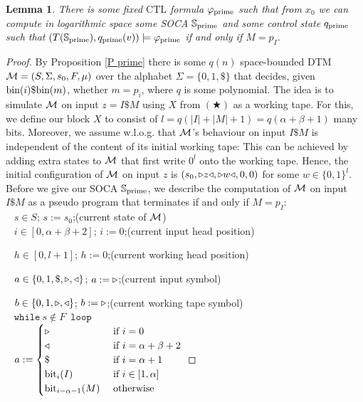 \documentclass[times,envcountsame]{llncs}
\newtheorem{lemma}[theorem]{{\bf Lemma}}
\newcommand{\Soca}{\mathbb{S}}
\newcommand{\ctl}{\text{CTL}}
\begin{document}
\begin{lemma}{\label{L prim}} There is some fixed $\ctl$ formula $\varphi_{\text{prime}}$ such that
from  $x_0$ we can compute in logarithmic space some SOCA
$\Soca_\prim$ and some control state $q_{\text{prime}}$ such that
$(T(\Soca_\prim),q_\prim(v))\models\varphi_\prim$ %
if and only if $M=p_I$.
\end{lemma}
\begin{proof}
By Proposition \ref{P prime} there is some $q(n)$ space-bounded DTM
$\mathcal{M}=(S,\Sigma,s_0,F,\mu)$
over the alphabet $\Sigma=\{0,1,\$\}$ that decides,
given $\text{bin}(i)\$\text{bin}(m)$, whether $m=p_i$, where $q$ is some polynomial.
The idea is to simulate $\mathcal{M}$ on input $z=I\$M$ using $X$ from $(\bigstar)$ as a working tape.
For this, we define our block $X$ to consist of
$l=q(|I|+|M|+1)=q(\alpha+\beta+1)$ many bits.
Moreover, we assume w.l.o.g. that $\mathcal{M}$'s behaviour on input $I\$M$ is
independent of the content of its initial working tape: This can be
achieved by adding extra states to $\mathcal{M}$ that first write $0^l$ onto
the working tape.
Hence, the initial configuration of $\mathcal{M}$ on input $z$ is
$(s_0,\triangleright z\triangleleft,\triangleright w \triangleleft,0,0)$ for some $w\in\{0,1\}^l$.
Before we give our SOCA $\Soca_\prim$, we describe the computation of
$\mathcal{M}$ on input $I\$M$ as a pseudo program that terminates if and only if $M=p_I$:\\


\ \hspace{2cm} $s\in S$; $s:=s_0$;\quad  (current state of $\mathcal{M}$)\\[-0.4cm]

\ \hspace{2cm} $i\in[0,\alpha+\beta+2]$; $i:=0$;\quad (current input head position)

\ \hspace{2cm} $h\in[0,l+1]$; $h:=0$;\quad (current working head position)

\ \hspace{2cm} $a\in\{0,1,\$,\triangleright,\triangleleft\}$; $a:=\triangleright$;\quad (current input symbol)

\ \hspace{2cm} $b\in\{0,1,\triangleright,\triangleleft\}$; $b:=\triangleright$;\quad (current working tape
symbol)\\[0.05cm]

\ \hspace{2cm} $\mathtt{while }\  s\not\in F$\ $\mathtt{ loop}$\\[-0.4cm]

\ \hspace{3cm} $a:=\begin{cases} \triangleright& \text{ if }i=0\\
\triangleleft &\text{ if }i=\alpha+\beta+2\\
\$ &\text{ if }i=\alpha+1\\
\text{bit}_i(I) &\text{ if }i\in[1,\alpha]\\
\text{bit}_{i-\alpha-1}(M) &\text{ otherwise }
\end{cases}$


\end{proof}
\end{document}
